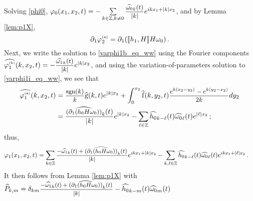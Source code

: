 \documentclass[11pt]{article}
\theoremstyle{plain}
\theoremstyle{definition}
\theoremstyle{definition}
\def\bbZ{{\mathbb Z}}
\def\rf{{\rm f}}
\def\rg{{\rm g}}
\def\p{\text{\bf\emph{p}}}
\def\ft #1{{\widehat{#1}}}
\def\p{{\partial\hspace{1pt}}}
\def\comm#1#2{{\llbracket#1,#2\rrbracket}}
\def\smallexp#1{{\text{\small #1}}}
\def\footnoteexp#1{{\text{\footnotesize #1}}}
\def\dfrac#1#2{\smallexp{$\displaystyle{}\frac{#1}{#2}$}}
\def\ddfrac#1#2{\footnoteexp{$\displaystyle{}\frac{#1}{#2}$}}
\begin{document}
Solving  \eqref{phi0},  $\varphi_0(x_1,x_2,t) = -\sum\limits_{k\in\bbZ,k\ne 0} \dfrac{\ft{\omega_0}_k(t)}{|k|} e^{ikx_1 + |k| x_2}$, and by Lemma
\ref{lem:p1X},
\begin{equation}\label{p1phi2a}
\p_{\!1} \varphi_2^{\text{\tiny(a)}}
= \p_{\!1} (\comm{h_1}{H} H \omega_0)\,.
\end{equation}
Next, we write the solution to  \eqref{varphi1b_eq_ww} using the Fourier components $\ft{\varphi_1^{\text{\tiny(b)}}}(k,x_2,t) = -\dfrac{\ft{\omega_1}_k(t)}{|k|} e^{|k| x_2}$, and
using %
the variation-of-parameters solution to \eqref{varphi1i_eq_ww},
we see that
\begin{align*}
\ft{\varphi_1^{\text{\tiny(a)}}}(k,x_2,t) &= \dfrac{\text{\rm sgn}(k)}{k} \ft{\rg}(k,t) e^{|k|x_2} + \int_0^{x_2} \ft{\rf}(k,y_2,t) \dfrac{e^{k(x_2-y_2)} - e^{k(y_2-x_2)}}{2k} dy_2 \\
&= \frac{\ft{\smallexp{$(\p_{\!1}(h_0 H \omega_0))$}}_k(t)}{|k|} e^{|k|x_2} - \sum\limits_{\ell\in \bbZ} \ft{h_0}_{k-\ell}(t) \ft{\omega_0}_\ell(t) e^{|\ell|x_2} \,;
\end{align*}
thus,
\begin{align*}
\varphi_1(x_1,x_2,t) &= \sum_{k\in\bbZ} \dfrac{- \ft{\omega_1}_k(t) + \ft{\smallexp{$(\p_{\!1}(h_0 H \omega_0))$}}_k(t)}{|k|} e^{ikx_1 + |k|x_2} - \sum_{k,\ell\in \bbZ} \ft{h_0}_{k-\ell}(t) \ft{\omega_0}_\ell(t) e^{ikx_1 + |\ell|x_2}\,.
\end{align*}
It then follows from Lemma \ref{lem:p1X} with $\ft{P}_{k,m} = \delta_{km} \ddfrac{- \ft{\omega_1}_k(t) + \ft{(\p_{\!1}(h_0 H \omega_0))}_k(t)}{|k|} - \ft{h_0}_{k-m}(t) \ft{\omega_0}_m(t)$
\end{document}
